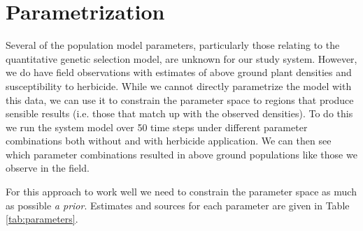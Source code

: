 \documentclass[12pt, a4paper]{article}
\begin{document}
\section{Parametrization}
Several of the population model parameters, particularly those relating to the quantitative genetic selection model, are unknown for our study system. However, we do have field observations with estimates of above ground plant densities and susceptibility to herbicide. While we cannot directly parametrize the model with this data, we can use it to constrain the parameter space to regions that produce sensible results (i.e. those that match up with the observed densities). To do this we run the system model over 50 time steps under different parameter combinations both without and with herbicide application. We can then see which parameter combinations resulted in above ground populations like those we observe in the field.  

For this approach to work well we need to constrain the parameter space as much as possible \textit{a prior}. Estimates and sources for each parameter are given in Table \ref{tab:parameters}.          
\end{document}
